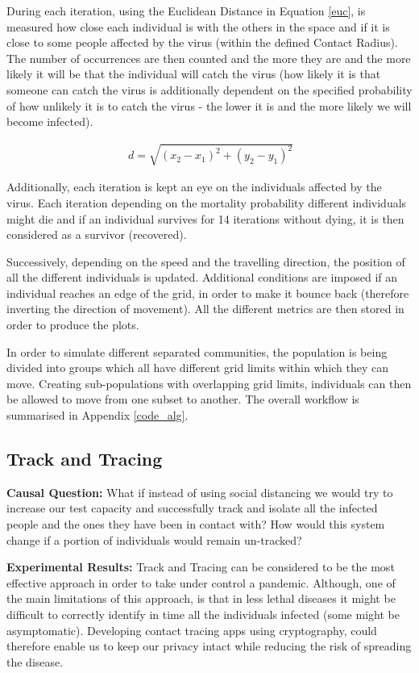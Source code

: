 During each iteration, using the Euclidean Distance in Equation \ref{euc}, is measured how close each individual is with the others in the space and if it is close to some people affected by the virus (within the defined Contact Radius). The number of occurrences are then counted and the more they are and the more likely it will be that the individual will catch the virus (how likely it is that someone can catch the virus is additionally dependent on the specified probability of how unlikely it is to catch the virus - the lower it is and the more likely we will become infected).

\useshortskip
\begin{align}
\ d = \sqrt{(x_{2}-x_{1})^{2}+(y_{2}-y_{1})^{2}}
\label{euc}
\end{align}
\useshortskip

Additionally, each iteration is kept an eye on the individuals affected by the virus. Each iteration depending on the mortality probability different individuals might die and if an individual survives for 14 iterations without dying, it is then considered as a survivor (recovered).

Successively, depending on the speed and the travelling direction, the position of all the different individuals is updated. Additional conditions are imposed if an individual reaches an edge of the grid, in order to make it bounce back (therefore inverting the direction of movement). All the different metrics are then stored in order to produce the plots.

In order to simulate different separated communities, the population is being divided into groups which all have different grid limits within which they can move. Creating sub-populations with overlapping grid limits, individuals can then be allowed to move from one subset to another. The overall workflow is summarised in Appendix \ref{code_alg}.

\subsection{Track and Tracing}

\textbf{Causal Question:} What if instead of using social distancing we would try to increase our test capacity and successfully track and isolate all the infected people and the ones they have been in contact with? How would this system change if a portion of individuals would remain un-tracked?

\textbf{Experimental Results:} Track and Tracing can be considered to be the most effective approach in order to take under control a pandemic. Although, one of the main limitations of this approach, is that in less lethal diseases it might be difficult to correctly identify in time all the individuals infected (some might be asymptomatic). Developing contact tracing apps using cryptography, could therefore enable us to keep our privacy intact while reducing the risk of spreading the disease.

